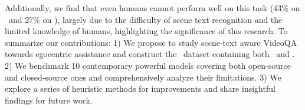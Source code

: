 Additionally, we find that even humans cannot perform well on this task (43\% on \datasetout~and 27\% on \datasetin), largely
due to the difficulty of scene text recognition and the limited knowledge of humans, highlighting the significance of this research.
To summarize our contributions: 1) We propose to study scene-text aware VideoQA towards egocentric assistance and construct the \dataset ~dataset containing both \datasetin ~and \datasetout. 2) We benchmark 10 contemporary powerful models covering both open-source and closed-source ones and comprehensively analyze their limitations. 3) We explore a series of heuristic methods for improvements and share insightful findings for future work.


